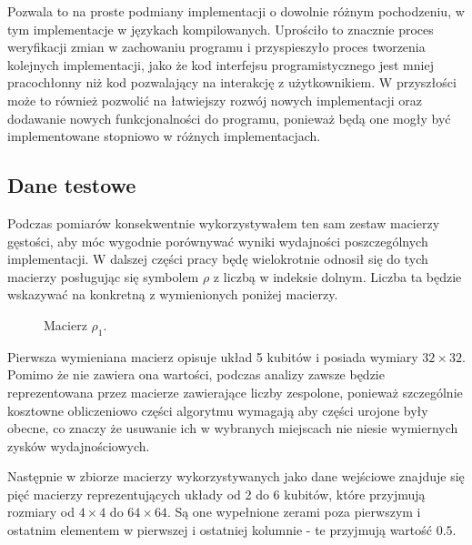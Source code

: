 \documentclass[11pt, a4paper]{article}
\begin{document}
\begin{sloppypar}
    Pozwala to na proste podmiany implementacji o dowolnie różnym pochodzeniu, w tym implementacje
    w językach kompilowanych. Uprościło to znacznie proces weryfikacji zmian w
    zachowaniu programu i przyspieszyło proces tworzenia kolejnych implementacji, jako że
    kod interfejsu programistycznego jest mniej pracochłonny niż kod pozwalający na interakcję
    z użytkownikiem. W przyszłości może to również pozwolić na łatwiejszy rozwój nowych
    implementacji oraz dodawanie nowych funkcjonalności do programu, ponieważ będą one mogły
    być implementowane stopniowo w różnych implementacjach.

    \subsection{Dane testowe}
    Podczas pomiarów konsekwentnie wykorzystywałem ten sam zestaw macierzy gęstości, aby
    móc wygodnie porównywać wyniki wydajności poszczególnych implementacji. W dalszej części
    pracy będę wielokrotnie odnosił się do tych macierzy posługując się symbolem $\rho$ z
    liczbą w indeksie dolnym. Liczba ta będzie wskazywać na konkretną z wymienionych
    poniżej macierzy.

    \FloatBarrier
    \begin{figure}[ht]
      \centering
      \setcounter{MaxMatrixCols}{33}
      
      \caption{Macierz $\rho_{1}$.}
      \label{rho-1}
    \end{figure}

    \FloatBarrier

    Pierwsza wymieniana macierz opisuje układ 5 kubitów i posiada wymiary $32\times32$. Pomimo
    że nie zawiera ona wartości, podczas analizy zawsze będzie reprezentowana przez
    macierze zawierające liczby zespolone, ponieważ szczególnie kosztowne obliczeniowo części
    algorytmu wymagają aby części urojone były obecne, co znaczy że usuwanie ich w
    wybranych miejscach nie niesie wymiernych zysków wydajnościowych.

    Następnie w zbiorze macierzy wykorzystywanych jako dane wejściowe znajduje się pięć
    macierzy reprezentujących układy od 2 do 6 kubitów, które przyjmują rozmiary od $4\times
    4$ do $64\times64$. Są one wypełnione zerami poza pierwszym i ostatnim elementem w
    pierwszej i ostatniej kolumnie - te przyjmują wartość $0.5$.


\end{sloppypar}
\end{document}
